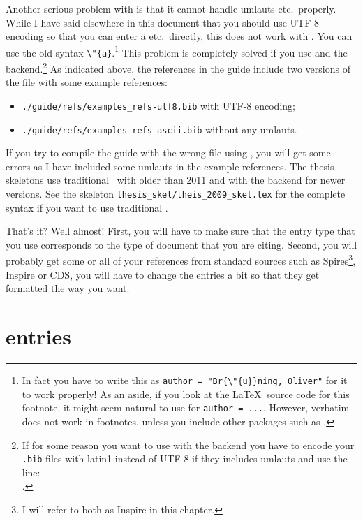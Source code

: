 Another serious problem with \BibTeX{} is that it cannot handle
umlauts etc.\ properly. While I have said elsewhere in this document
that you should use UTF-8 encoding so that you can enter ä
etc.\ directly, this does not work with \BibTeX. You can use the
old syntax \verb+\"{a}+.\footnote{%
  In fact you have to write this as \texttt{author = "Br\{\textbackslash"\{u\}\}ning, Oliver"} for it to work properly!
  As an aside, if you look at the \LaTeX\ source code for this footnote,
  it might seem natural to use  for \texttt{author = ...}.
  However, verbatim does not work in footnotes,
  unless you include other packages such as .}
This problem is completely solved if you use
 and the  backend.\footnote{%
If for some reason you want to use  with the  backend
you have to encode your \texttt{.bib}
files with latin1 instead of UTF-8 if they includes umlauts and use the line:\\
.}
As indicated above, the references in the guide include two versions of the file with some example references:
\begin{itemize}
\setlength{\parskip}{0pt}\setlength{\itemsep}{0pt}
\item \texttt{./guide/refs/examples\_refs-utf8.bib} with UTF-8 encoding;
\item \texttt{./guide/refs/examples\_refs-ascii.bib} without any umlauts.
\end{itemize}
If you try to compile the guide with the wrong file using \BibTeX, you
will get some errors as I have included some umlauts in the example
references.
The thesis skeletons use traditional \BibTeX\ with \TeXLive older than 2011
and  with the  backend for newer versions.
See the skeleton \texttt{thesis\_skel/theis\_2009\_skel.tex} for the complete syntax
if you want to use traditional \BibTeX.

That's it? Well almost! First, you will have to make sure that the
entry type that you use corresponds to the type of document that you
are citing. Second, you will probably get some or all of your
references from standard sources such as Spires\footnote{I
  will refer to both as Inspire in this chapter.}, Inspire or CDS, you will have
to change the entries a bit so that they get formatted the way you want.


\section{\BibTeX{} entries}
\label{sec:ref:bib}

